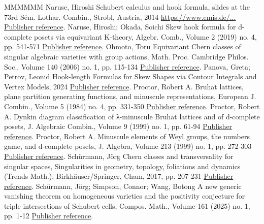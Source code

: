 \begin{thebibliography}{MMMMMM}
 Naruse, Hiroshi Schubert calculus and hook formula, slides at the 73rd Sém. Lothar. Combin., Strobl, Austria, 2014 \url{https://www.emis.de/...} \href{https://alco.centre-mersenne.org/articles/10.5802/alco.428/#naruse2014schubert}{Publisher reference}.
 Naruse, Hiroshi; Okada, Soichi Skew hook formula for d-complete posets via equivariant K-theory, Algebr. Comb., Volume 2 (2019) no. 4, pp. 541-571 \href{https://alco.centre-mersenne.org/articles/10.5802/alco.428/#naruse2019skew}{Publisher reference}.
 Ohmoto, Toru Equivariant Chern classes of singular algebraic varieties with group actions, Math. Proc. Cambridge Philos. Soc., Volume 140 (2006) no. 1, pp. 115-134 \href{https://alco.centre-mersenne.org/articles/10.5802/alco.428/#ohmoto:eqcsm}{Publisher reference}.
 Panova, Greta; Petrov, Leonid Hook-length Formulas for Skew Shapes via Contour Integrals and Vertex Models, 2024 \href{https://alco.centre-mersenne.org/articles/10.5802/alco.428/#panova.petrov:hook}{Publisher reference}.
 Proctor, Robert A. Bruhat lattices, plane partition generating functions, and minuscule representations, European J. Combin., Volume 5 (1984) no. 4, pp. 331-350 \href{https://alco.centre-mersenne.org/articles/10.5802/alco.428/#proctor:bruhat}{Publisher reference}.
 Proctor, Robert A. Dynkin diagram classification of λ-minuscule Bruhat lattices and of d-complete posets, J. Algebraic Combin., Volume 9 (1999) no. 1, pp. 61-94 \href{https://alco.centre-mersenne.org/articles/10.5802/alco.428/#proctor:dynkin}{Publisher reference}.
 Proctor, Robert A. Minuscule elements of Weyl groups, the numbers game, and d-complete posets, J. Algebra, Volume 213 (1999) no. 1, pp. 272-303 \href{https://alco.centre-mersenne.org/articles/10.5802/alco.428/#proctor:minuscule}{Publisher reference}.
 Schürmann, Jörg Chern classes and transversality for singular spaces, Singularities in geometry, topology, foliations and dynamics (Trends Math.), Birkhäuser/Springer, Cham, 2017, pp. 207-231 \href{https://alco.centre-mersenne.org/articles/10.5802/alco.428/#schurmann:transversality}{Publisher reference}.
 Schürmann, Jörg; Simpson, Connor; Wang, Botong A new generic vanishing theorem on homogeneous varieties and the positivity conjecture for triple intersections of Schubert cells, Compos. Math., Volume 161 (2025) no. 1, pp. 1-12 \href{https://alco.centre-mersenne.org/articles/10.5802/alco.428/#schurmann.simpson.wang}{Publisher reference}.

\end{thebibliography}
